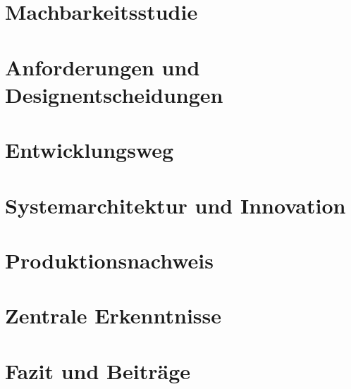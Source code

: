 \documentclass[
paper=A4,        
fontsize=12,        
DIV=11,           
parskip=half,    
headsepline,   
numbers=noenddot  
]{scrartcl}
\begin{document}
    \newpage

    \section{Machbarkeitsstudie}\label{sec:feasibility}


    \newpage

    \section{Anforderungen und Designentscheidungen}\label{sec:requirements}

    \newpage

    \section{Entwicklungsweg}\label{sec:development}

    \newpage

    \section{Systemarchitektur und Innovation}\label{sec:system}


    \newpage

    \section{Produktionsnachweis}\label{sec:showcase}


    \newpage

    \section{Zentrale Erkenntnisse}\label{sec:insights}
        

    \newpage

    \section{Fazit und Beiträge}\label{sec:conclusions}
        
\end{document}
